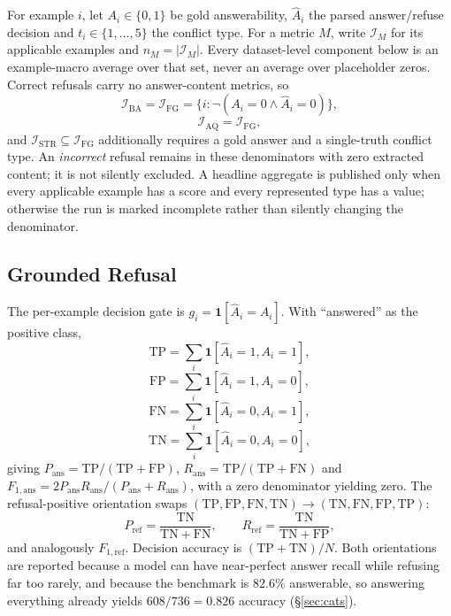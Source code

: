 For example $i$, let $A_i\in\{0,1\}$ be gold answerability, $\hat A_i$ the parsed
answer/refuse decision and $t_i\in\{1,\dots,5\}$ the conflict type. For a metric
$M$, write $\mathcal{I}_M$ for its applicable examples and $n_M=|\mathcal{I}_M|$.
Every dataset-level component below is an example-macro average over that set,
never an average over placeholder zeros. Correct refusals carry no
answer-content metrics, so
\[
\mathcal{I}_{\mathrm{BA}}=\mathcal{I}_{\mathrm{FG}}
=\{i:\neg(A_i=0 \wedge \hat A_i=0)\},
\]
\[
\mathcal{I}_{\mathrm{AQ}}=\mathcal{I}_{\mathrm{FG}},
\]
and $\mathcal{I}_{\mathrm{STR}}\subseteq\mathcal{I}_{\mathrm{FG}}$ additionally
requires a gold answer and a single-truth conflict type. An \emph{incorrect}
refusal remains in these denominators with zero extracted content; it is not
silently excluded. A headline aggregate is published only when every applicable
example has a score and every represented type has a value; otherwise the run is
marked incomplete rather than silently changing the denominator.

\subsection{Grounded Refusal}

The per-example decision gate is $g_i=\mathbf{1}[\hat A_i=A_i]$. With
``answered'' as the positive class,
\[
\mathrm{TP}=\textstyle\sum_i\mathbf{1}[\hat A_i{=}1,A_i{=}1],
\]
\[
\mathrm{FP}=\textstyle\sum_i\mathbf{1}[\hat A_i{=}1,A_i{=}0],
\]
\[
\mathrm{FN}=\textstyle\sum_i\mathbf{1}[\hat A_i{=}0,A_i{=}1],
\]
\[
\mathrm{TN}=\textstyle\sum_i\mathbf{1}[\hat A_i{=}0,A_i{=}0],
\]
giving $P_{\mathrm{ans}}=\mathrm{TP}/(\mathrm{TP}+\mathrm{FP})$,
$R_{\mathrm{ans}}=\mathrm{TP}/(\mathrm{TP}+\mathrm{FN})$ and
$F_{1,\mathrm{ans}}=2P_{\mathrm{ans}}R_{\mathrm{ans}}/(P_{\mathrm{ans}}+R_{\mathrm{ans}})$,
with a zero denominator yielding zero. The refusal-positive orientation swaps
$(\mathrm{TP},\mathrm{FP},\mathrm{FN},\mathrm{TN})\!\to\!(\mathrm{TN},\mathrm{FN},\mathrm{FP},\mathrm{TP})$:
\[
P_{\mathrm{ref}}=\frac{\mathrm{TN}}{\mathrm{TN}+\mathrm{FN}},\qquad
R_{\mathrm{ref}}=\frac{\mathrm{TN}}{\mathrm{TN}+\mathrm{FP}},
\]
and analogously $F_{1,\mathrm{ref}}$. Decision accuracy is
$(\mathrm{TP}+\mathrm{TN})/N$. Both orientations are reported because a model can
have near-perfect answer recall while refusing far too rarely, and because the
benchmark is $82.6\%$ answerable, so answering everything already yields
$608/736=0.826$ accuracy (\S\ref{sec:cats}).

